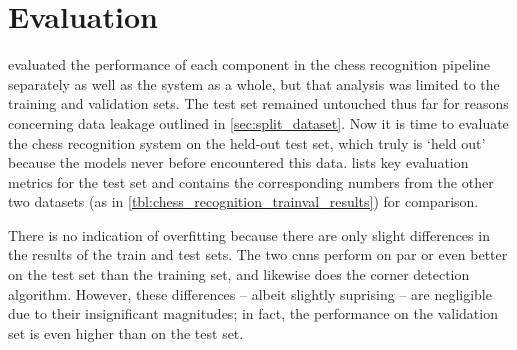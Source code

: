 \documentclass[../report.tex]{subfiles}
\begin{document}
\chapter{Evaluation}
\label{chap:evaluation}
 evaluated the performance of each component in the chess recognition pipeline separately as well as the system as a whole, but that analysis was limited to the training and validation sets.
The test set remained untouched thus far for reasons concerning data leakage outlined in \cref{sec:split_dataset}.
Now it is time to evaluate the chess recognition system on the held-out test set, which truly is `held out' because the models never before encountered this data.
 lists key evaluation metrics for the test set and contains the corresponding numbers from the other two datasets (as in \cref{tbl:chess_recognition_trainval_results}) for comparison.
\begin{table}
    \caption[Performance of the chess recognition system on the test dataset.]{Performance of the chess recognition system on the test dataset. The training and validation metrics as per \cref{tbl:chess_recognition_trainval_results} are included for comparison.}
    \label{tbl:chess_recognition_trainvaltest_results}
\end{table}
There is no indication of overfitting because there are only slight differences in the results of the train and test sets.
The two \glspl{cnn} perform on par or even better on the test set than the training set, and likewise does the corner detection algorithm.
However, these differences -- albeit slightly suprising -- are negligible due to their insignificant magnitudes; in fact, the performance on the validation set is even higher than on the test set.
\end{document}
